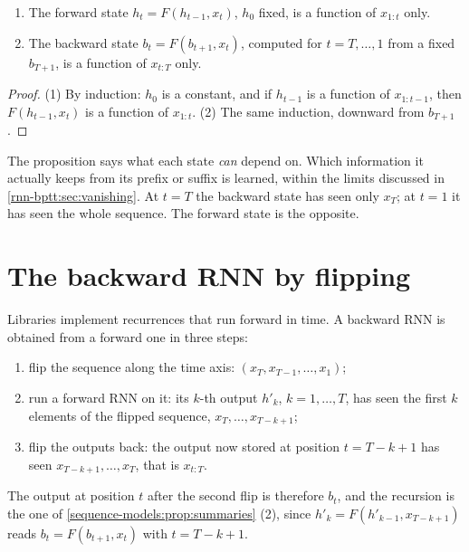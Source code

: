 \begin{notechapter}
\begin{proposition}\label{sequence-models:prop:summaries}
\begin{enumerate}[nosep]
  \item The forward state $h_t = F(h_{t-1}, x_t)$, $h_0$ fixed, is a function of $x_{1:t}$ only.
  \item The backward state $b_t = F(b_{t+1}, x_t)$, computed for $t = T,\dots,1$ from a fixed $b_{T+1}$, is a function of
        $x_{t:T}$ only.
\end{enumerate}
\end{proposition}

\begin{proof}
(1) By induction: $h_0$ is a constant, and if $h_{t-1}$ is a function of $x_{1:t-1}$, then $F(h_{t-1}, x_t)$ is a function of
$x_{1:t}$. (2) The same induction, downward from $b_{T+1}$.
\end{proof}

The proposition says what each state \emph{can} depend on. Which information it actually
keeps from its prefix or suffix is learned, within the limits discussed in
\cref{rnn-bptt:sec:vanishing}. At $t = T$ the backward state has seen only $x_T$; at $t = 1$ it has seen the
whole sequence. The forward state is the opposite.

\section{The backward RNN by flipping}\label{sequence-models:sec:flip}

Libraries implement recurrences that run forward in time. A backward RNN is obtained from
a forward one in three steps:
\begin{enumerate}[nosep]
  \item flip the sequence along the time axis: $(x_T, x_{T-1},\dots,x_1)$;
  \item run a forward RNN on it: its $k$-th output $h'_k$, $k = 1,\dots,T$, has seen the first $k$ elements of the flipped
        sequence, $x_T,\dots,x_{T-k+1}$;
  \item flip the outputs back: the output now stored at position $t = T - k + 1$ has seen $x_{T-k+1},\dots,x_T$, that is $x_{t:T}$.
\end{enumerate}
The output at position $t$ after the second flip is therefore $b_t$, and the recursion is the one of
\cref{sequence-models:prop:summaries} (2), since $h'_k = F(h'_{k-1}, x_{T-k+1})$ reads $b_t = F(b_{t+1}, x_t)$ with $t = T - k + 1$.


\end{notechapter}
